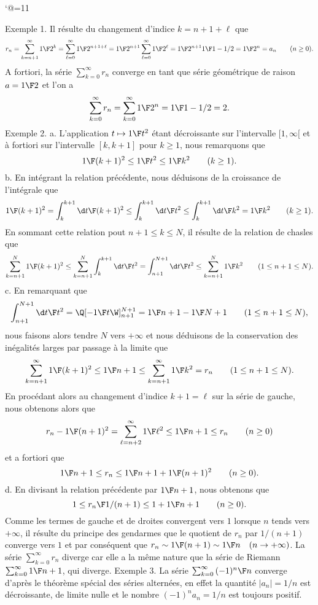 \catcode`@=11\relax



\vglue-10mm
\bigskip

Exemple 1. Il résulte du changement d'indice $k=n+1+\ell$ que 
$$
r_n=\sum_{k=n+1}^\infty{1\F2^k}=\sum_{\ell=0}^\infty{1\F2^{n+1+\ell}}={1\F2^{n+1}}\sum_{\ell=0}^\infty{1\F2^\ell}={1\F2^{n+1}}{1\F1-1/2}
={1\F 2^n}=a_n\qquad(n\ge0).
$$
A fortiori, la série $\sum_{k=0}^\infty r_n$ converge en tant que série géométrique de raison $a={1\F2}$ et l'on a 
$$
\sum_{k=0}^\infty r_n=\sum_{k=0}^\infty {1\F 2^n}={1\F 1-1/2}=2.
$$
\bigskip\noindent
Exemple 2. a. L'application $t\mapsto{1\F t^2}$ étant décroissante sur l'intervalle $[1, \infty[$ et à fortiori sur l'intervalle $[k,k+1]$ pour $k\ge1$, nous remarquons que 
$$
{1\F (k+1)^2}\le {1\F t^2}\le{1\F k^2}\qquad(k\ge1).
$$
b. En intégrant la relation précédente, nous déduisons de la croissance de l'intégrale que 
$$
{1\F (k+1)^2}=\int_k^{k+1}{\d t\F (k+1)^2}\le \int_k^{k+1}{\d t\F t^2}\le\int_k^{k+1}{\d t\F k^2}={1\F k^2}\qquad(k\ge1).
$$
En sommant cette relation pout $n+1\le k\le N$, il résulte de la relation de chasles que 
$$
\sum_{k=n+1}^N{1\F(k+1)^2}\le \sum_{k=n+1}^N \int_k^{k+1}{\d t\F t^2}=\int_{n+1}^{N+1}{\d t\F t^2}\le \sum_{k=n+1}^N{1\F k^2}\qquad (1\le n+1\le N).
$$
c. En remarquant que 
$$
\int_{n+1}^{N+1}{\d t\F t^2}=\Q[-{1\F t}\W]_{n+1}^{N+1}={1\F n+1}-{1\F N+1}\qquad (1\le n+1\le N),
$$
nous faisons alors tendre $N$ vers $+\infty$ et nous déduisons de la conservation des inégalités larges par passage à la limite que  
$$
\sum_{k=n+1}^\infty{1\F(k+1)^2}\le {1\F n+1}\le \sum_{k=n+1}^\infty{1\F k^2}=r_n\qquad (1\le n+1\le N).
$$
En procédant alors au changement d'indice $k+1=\ell$ sur la série de gauche, nous obtenons alors que 
$$
r_n-{1\F (n+1)^2}=\sum_{\ell=n+2}^\infty{1\F\ell^2}\le  {1\F n+1}\le r_n\qquad (n\ge0)
$$
et a fortiori que
$$
{1\F n+1}\le r_n\le {1\F n+1} + {1\F (n+1)^2}\qquad(n\ge0).
$$
d. En divisant la relation précédente par ${1\F n+1}$, nous obtenons que 
$$
1\le {r_n\F 1/(n+1)}\le 1 + {1\F n+1}\qquad(n\ge0).
$$
Comme les termes de gauche et de droites convergent vers $1$ lorsque $n$ tends vers $+\infty$, il résulte du principe des gendarmes que le quotient de $r_n$ par $1/(n+1)$ converge vers $1$ et par conséquent que $r_n\sim{1\F(n+1)}\sim{1\F n}\quad(n\to+\infty)$.
\medskip
La série $\sum_{k=0}^\infty r_n$ diverge car elle a la même nature que la série de Riemann $\sum_{k=0}^\infty {1\F n+1}$, qui diverge. 
\bigskip
Exemple 3. La série $\sum_{k=0}^\infty {(-1)^n\F n}$ converge d'après le théorème spécial des séries alternées, en effet la quantité $|a_n|=1/n$ est décroissante, de limite nulle et le nombre $(-1)^na_n=1/n$ est toujours positif.
